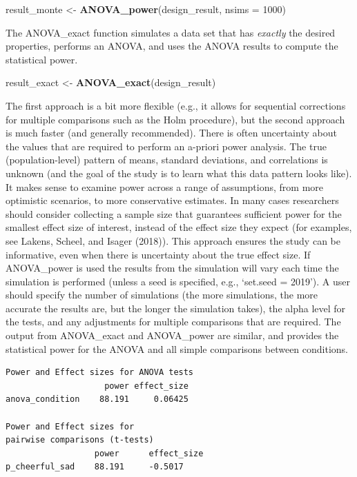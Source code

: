 \documentclass[
  english,
  ,jou,floatsintext]{apa6}
\newenvironment{Shaded}{\begin{snugshade}}{\end{snugshade}}
\newcommand{\DataTypeTok}[1]{\textcolor[rgb]{0.13,0.29,0.53}{#1}}
\newcommand{\DecValTok}[1]{\textcolor[rgb]{0.00,0.00,0.81}{#1}}
\newcommand{\KeywordTok}[1]{\textcolor[rgb]{0.13,0.29,0.53}{\textbf{#1}}}
\newcommand{\NormalTok}[1]{#1}
\newcommand{\StringTok}[1]{\textcolor[rgb]{0.31,0.60,0.02}{#1}}
\begin{document}
\begin{Shaded}
\begin{Highlighting}[]
\NormalTok{result_monte <-}\StringTok{ }\KeywordTok{ANOVA_power}\NormalTok{(design_result, }
                            \DataTypeTok{nsims =} \DecValTok{1000}\NormalTok{)}
\end{Highlighting}
\end{Shaded}

The ANOVA\_exact function simulates a data set that has \emph{exactly} the desired properties, performs an ANOVA, and uses the ANOVA results to compute the statistical power.

\begin{Shaded}
\begin{Highlighting}[]
\NormalTok{result_exact <-}\StringTok{ }\KeywordTok{ANOVA_exact}\NormalTok{(design_result)}
\end{Highlighting}
\end{Shaded}

The first approach is a bit more flexible (e.g., it allows for sequential corrections for multiple comparisons such as the Holm procedure), but the second approach is much faster (and generally recommended).
There is often uncertainty about the values that are required to perform an a-priori power analysis.
The true (population-level) pattern of means, standard deviations, and correlations is unknown (and the goal of the study is to learn what this data pattern looks like).
It makes sense to examine power across a range of assumptions, from more optimistic scenarios, to more conservative estimates.
In many cases researchers should consider collecting a sample size that guarantees sufficient power for the smallest effect size of interest, instead of the effect size they expect (for examples, see Lakens, Scheel, and Isager (2018)).
This approach ensures the study can be informative, even when there is uncertainty about the true effect size.
If ANOVA\_power is used the results from the simulation will vary each time the simulation is performed (unless a seed is specified, e.g., `set.seed = 2019').
A user should specify the number of simulations (the more simulations, the more accurate the results are, but the longer the simulation takes), the alpha level for the tests, and any adjustments for multiple comparisons that are required.
The output from ANOVA\_exact and ANOVA\_power are similar, and provides the statistical power for the ANOVA and all simple comparisons between conditions.

\begin{verbatim}
Power and Effect sizes for ANOVA tests
                    power effect_size
anova_condition    88.191     0.06425

Power and Effect sizes for 
pairwise comparisons (t-tests)
                  power      effect_size
p_cheerful_sad    88.191     -0.5017
\end{verbatim}
\end{document}

